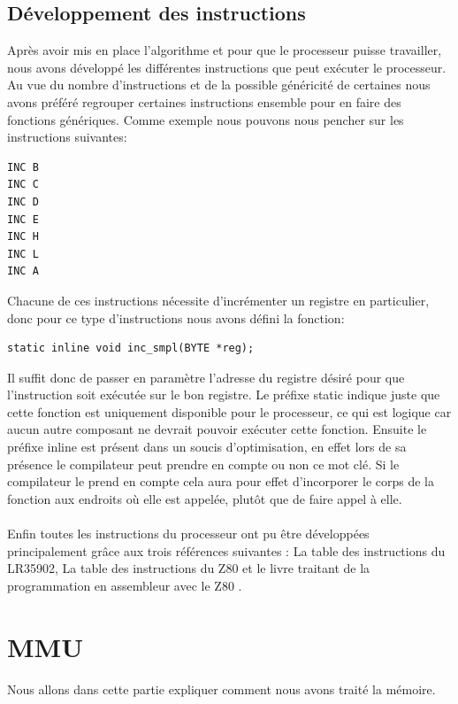 \documentclass[french]{report}
\begin{document}
\subsection{Développement des instructions}
Après avoir mis en place l'algorithme et pour que le processeur puisse travailler, nous avons développé les différentes instructions que peut exécuter le processeur. Au vue du nombre d'instructions et de la possible généricité de certaines nous avons préféré regrouper certaines instructions ensemble pour en faire des fonctions génériques. Comme exemple nous pouvons nous pencher sur les instructions suivantes:
\begin{lstlisting}
INC B
INC C
INC D
INC E
INC H
INC L
INC A
\end{lstlisting}
Chacune de ces instructions nécessite d'incrémenter un registre en particulier, donc pour ce type d'instructions nous avons défini la fonction:
\begin{lstlisting}
static inline void inc_smpl(BYTE *reg);
\end{lstlisting}
Il suffit donc de passer en paramètre l'adresse du registre désiré pour que l'instruction soit exécutée sur le bon registre.
Le préfixe static indique juste que cette fonction est uniquement disponible pour le processeur, ce qui est logique car aucun autre composant ne devrait pouvoir exécuter cette fonction. Ensuite le préfixe inline est présent dans un soucis d'optimisation, en effet lors de sa présence le compilateur peut prendre en compte ou non ce mot clé. Si le compilateur le prend en compte cela aura pour effet d'incorporer le corps de la fonction aux endroits où elle est appelée, plutôt que de faire appel à elle.\\\\ 
Enfin toutes les instructions du processeur ont pu être développées principalement grâce aux trois références suivantes :
La table des instructions du LR35902\cite{pastraiser}, La table des instructions du Z80\cite{clrhome} et le livre traitant de la programmation en assembleur avec le Z80 \cite{pinaud}.
\section{MMU}
Nous allons dans cette partie expliquer comment nous avons traité la mémoire. 
\end{document}
